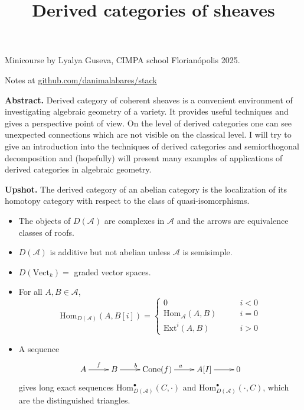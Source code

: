 


\title{Derived categories of sheaves}
\maketitle

Minicourse by Lyalya Guseva, CIMPA school Florianópolis 2025.

Notes at 
\href{http://github.com/danimalabares/stack}{github.com/danimalabares/stack}

\bigskip\noindent

{\bf Abstract.} Derived category of coherent sheaves is a convenient environment
of investigating algebraic geometry of a variety. It provides useful techniques
and gives a perspective point of view. On the level of derived categories one
can see unexpected connections which are not visible on the classical level. I
will try to give an introduction into the techniques of derived categories and
semiorthogonal decomposition and (hopefully) will present many examples of
applications of derived categories in algebraic geometry. 

\bigskip\noindent
\tableofcontents
\bigskip\noindent

{\bf Upshot.} The derived category of an abelian category is the localization of
its homotopy category with respect to the class of quasi-isomorphisms.
\begin{itemize}
\item The objects of $D(\mathcal{A})$ are complexes in $\mathcal{A}$ and the
arrows are equivalence classes of roofs.
\item $D(\mathcal{A})$ is additive but not abelian unless $\mathcal{A}$ is
semisimple.
\item $D(\text{Vect}_k)=$ graded vector spaces.
\item For all $A,B\in \mathcal{A}$,
$$
\text{Hom}_{D(\mathcal{A})}(A,B[i])=
\begin{cases}
0\qquad &i<0 \\
\text{Hom}_{\mathcal{A}}(A,B)\qquad &i=0\\
\text{Ext}^i(A,B)\qquad &i>0
\end{cases}
$$
\item A sequence
$$
\xymatrix{
A\ar[r]^f&B\ar[r]^b&\text{Cone}(f)\ar[r]^a&A[I]\ar[r]&0
}
$$
gives long exact sequences $\text{Hom}^\bullet_{D(\mathcal{A})}(C,\cdot)$ and 
$\text{Hom}^\bullet_{D(\mathcal{A})}(\cdot,C)$, which are the distinguished
triangles.
\end{itemize}

